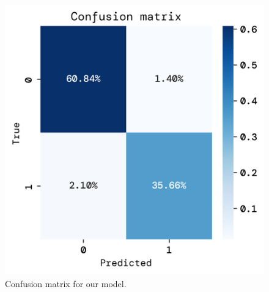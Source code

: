 \documentclass[twoside,11pt]{report}
\begin{document}
    \begin{figure}[!ht]
        \begin{minipage}[t]{0.5\textwidth - 1mm}
            \begin{center}
                \includegraphics[width=\textwidth]{../runsAndFigures/confusion_matrix.png}
            \end{center}
            \caption
            {
                Confusion matrix for our model. 
            }\label{fig:confusion_matrix}
        \end{minipage}
        \hspace{2mm}
        \begin{minipage}[t]{0.5\textwidth - 1mm}
            \begin{center}

\end{center}
\end{minipage}
\end{figure}
\end{document}
